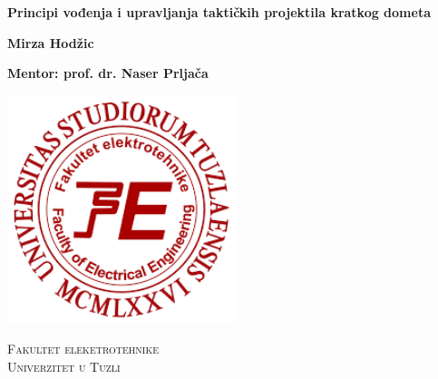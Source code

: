 \begin{titlepage}
    \begin{center}
        \vspace*{1cm}
        
        \Huge
        \textbf{Principi vođenja i upravljanja taktičkih projektila kratkog dometa}
        
        
        
        \vspace{1.5cm}
        
        \Large
        \textbf{Mirza Hodžic}\\
        
        \vspace{0.5cm}
        
        \textbf{Mentor: prof. dr. Naser Prljača}\\
        
        \vfill
        
        \includegraphics[width=0.5\textwidth]{Images/preuzmi.png}
        
        \vspace{0.8cm}
        
        
        \vspace{0.5cm}
        
        \LARGE
	    \textsc{Fakultet eleketrotehnike\\
	    Univerzitet u Tuzli}
	    
	    \begin{flushright}
	
	    \Large
	
	    \end{flushright}
        
    \end{center}
\end{titlepage}